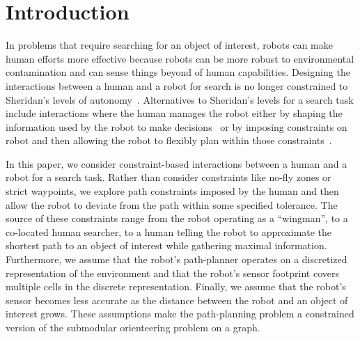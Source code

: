 \section{Introduction}
\label{sec:intro}

In problems that require searching for an object of interest, robots can make human efforts more effective because robots can be more robust to environmental contamination and can sense things beyond of human capabilities.
Designing the interactions between a human and a robot for search is no longer constrained to Sheridan's levels of autonomy~\cite{sheridan1978human}.
Alternatives to Sheridan's levels for a search task include interactions where the human manages the robot either by shaping the information used by the robot to make decisions~\cite{Lanny2010} or by imposing constraints on robot and then allowing the robot to flexibly plan within those constraints~\cite{Lanny2010,clark2013hierarchical,BradshawAdjAuto2002}.  

In this paper, we consider constraint-based interactions  between a human and a robot for a search task.
Rather than consider constraints like no-fly zones or strict waypoints, we explore path constraints imposed by the human and then allow the robot to deviate from the path within some specified tolerance.
The source of these constraints range from the robot operating as a ``wingman'', to a co-located human searcher, to a human telling the robot to approximate the shortest path to an object of interest while gathering maximal information.
Furthermore, we assume that the robot's path-planner operates on a discretized representation of the environment and that the robot's sensor footprint covers multiple cells in the discrete representation.
Finally, we assume that the robot's sensor becomes less accurate as the distance between the robot and an object of interest grows.
These assumptions make the path-planning problem a constrained version of the submodular orienteering problem on a graph.

